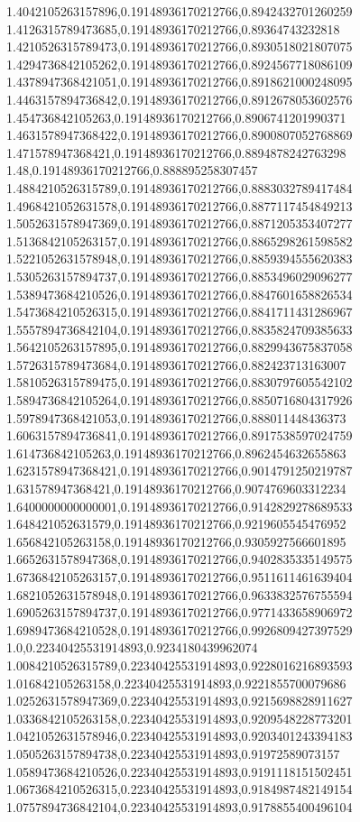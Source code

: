 1.4042105263157896,0.19148936170212766,0.8942432701260259
1.4126315789473685,0.19148936170212766,0.89364743232818
1.4210526315789473,0.19148936170212766,0.8930518021807075
1.4294736842105262,0.19148936170212766,0.8924567718086109
1.4378947368421051,0.19148936170212766,0.8918621000248095
1.4463157894736842,0.19148936170212766,0.8912678053602576
1.454736842105263,0.19148936170212766,0.8906741201990371
1.4631578947368422,0.19148936170212766,0.8900807052768869
1.471578947368421,0.19148936170212766,0.8894878242763298
1.48,0.19148936170212766,0.888895258307457
1.4884210526315789,0.19148936170212766,0.8883032789417484
1.4968421052631578,0.19148936170212766,0.8877117454849213
1.5052631578947369,0.19148936170212766,0.8871205353407277
1.5136842105263157,0.19148936170212766,0.8865298261598582
1.5221052631578948,0.19148936170212766,0.8859394555620383
1.5305263157894737,0.19148936170212766,0.8853496029096277
1.5389473684210526,0.19148936170212766,0.8847601658826534
1.5473684210526315,0.19148936170212766,0.8841711431286967
1.5557894736842104,0.19148936170212766,0.8835824709385633
1.5642105263157895,0.19148936170212766,0.8829943675837058
1.5726315789473684,0.19148936170212766,0.882423713163007
1.5810526315789475,0.19148936170212766,0.8830797605542102
1.5894736842105264,0.19148936170212766,0.8850716804317926
1.5978947368421053,0.19148936170212766,0.888011448436373
1.6063157894736841,0.19148936170212766,0.8917538597024759
1.614736842105263,0.19148936170212766,0.8962454632655863
1.6231578947368421,0.19148936170212766,0.9014791250219787
1.631578947368421,0.19148936170212766,0.9074769603312234
1.6400000000000001,0.19148936170212766,0.9142829278689533
1.648421052631579,0.19148936170212766,0.9219605545476952
1.656842105263158,0.19148936170212766,0.9305927566601895
1.6652631578947368,0.19148936170212766,0.9402835335149575
1.6736842105263157,0.19148936170212766,0.9511611461639404
1.6821052631578948,0.19148936170212766,0.9633832576755594
1.6905263157894737,0.19148936170212766,0.9771433658906972
1.6989473684210528,0.19148936170212766,0.9926809427397529
1.0,0.22340425531914893,0.9234180439962074
1.0084210526315789,0.22340425531914893,0.9228016216893593
1.016842105263158,0.22340425531914893,0.9221855700079686
1.0252631578947369,0.22340425531914893,0.9215698828911627
1.0336842105263158,0.22340425531914893,0.9209548228773201
1.0421052631578946,0.22340425531914893,0.9203401243394183
1.0505263157894738,0.22340425531914893,0.91972589073157
1.0589473684210526,0.22340425531914893,0.9191118151502451
1.0673684210526315,0.22340425531914893,0.9184987482149154
1.0757894736842104,0.22340425531914893,0.9178855400496104

